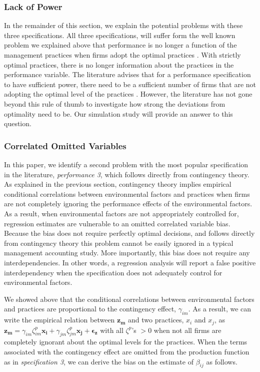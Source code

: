 \documentclass[12pt]{article}
\begin{document}
\subsubsection{Lack of Power}

In the remainder of this section, we explain the potential problems with these three specifications. All three specifications, will suffer form the well known problem we explained above that performance is no longer a function of the management practices when firms adopt the optimal practices \citep{Grabner2013}. With strictly optimal practices, there is no longer information about the practices in the performance variable. The literature advises that for a performance specification to have sufficient power, there need to be a sufficient number of firms that are not adopting the optimal level of the practices \citep{Bedford2016, Carree2011,  Hofmann2015OrganizationalChoices}. However, the literature has not gone beyond this rule of thumb to investigate how strong the deviations from optimality need to be. Our simulation study will provide an answer to this question.

\subsubsection{Correlated Omitted Variables}

In this paper, we identify a second problem with the most popular specification in the literature, \emph{performance 3}, which follows directly from contingency theory. As explained in the previous section, contingency theory implies empirical conditional correlations between environmental factors and practices when firms are not completely ignoring the performance effects of the environmental factors. As a result, when environmental factors are not appropriately controlled for, regression estimates are vulnerable to an omitted correlated variable bias. Because the bias does not require perfectly optimal decisions, and follows directly from contingency theory this problem cannot be easily ignored in a typical management accounting study. More importantly, this bias does not require any interdependencies. In other words, a regression analysis will report a false positive interdependency when the specification does not adequately control for environmental factors. 

We showed above that the conditional correlations between environmental factors and practices are proportional to the contingency effect, $\gamma_{im}$. As a result, we can write the empirical relation between $\mathbf{z_m}$ and two practices, $x_i$ and $x_j$, as $\mathbf{z_m} = \gamma_{im} \zeta^p_{im} \mathbf{x_i} + \gamma_{jm} \zeta^p_{jm} \mathbf{x_j} + \mathbf{\epsilon_z}$ with all $\zeta^p$'s $>0$ when not all firms are completely ignorant about the optimal levels for the practices.  When the terms associated with the contingency effect are omitted from the production function as in \emph{specification 3}, we can derive the bias on the estimate of $\beta_{ij}$ as follows.
\end{document}
